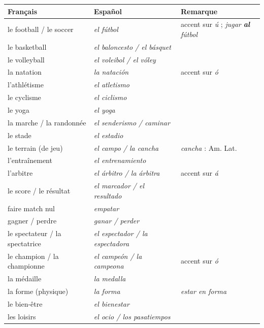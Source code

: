 \documentclass[11pt]{article}
\newcommand{\esp}[1]{\ifmmode\text{\textit{#1}}\else\begingroup\selectlanguage{spanish}\itshape #1\endgroup\fi}
\begin{document}
\begin{exemplebox}
\begin{center}
\begin{tabularx}{\linewidth}{|X|X|X|}
\hline
\rowcolor{popblueL} \textbf{Français} & \textbf{Español} & \textbf{Remarque} \\
\hline
le football / le soccer & \esp{el fútbol} & accent sur \emph{ú} ; \esp{jugar \textbf{al} fútbol} \\
le basketball & \esp{el baloncesto} / \esp{el básquet} &  \\
le volleyball & \esp{el voleibol} / \esp{el vóley} & \\
la natation & \esp{la natación} & accent sur \emph{ó} \\
l'athlétisme & \esp{el atletismo} & \\
le cyclisme & \esp{el ciclismo} & \\
le yoga & \esp{el yoga} & \\
la marche / la randonnée & \esp{el senderismo} / \esp{caminar} & \\
le stade & \esp{el estadio} & \\
le terrain (de jeu) & \esp{el campo} / \esp{la cancha} & \emph{cancha} : Am. Lat. \\
l'entraînement & \esp{el entrenamiento} & \\
l'arbitre & \esp{el árbitro / la árbitra} & accent sur \emph{á} \\
le score / le résultat & \esp{el marcador} / \esp{el resultado} & \\
faire match nul & \esp{empatar} & \\
gagner / perdre & \esp{ganar} / \esp{perder} & \\
le spectateur / la spectatrice & \esp{el espectador} / \esp{la espectadora} & \\
le champion / la championne & \esp{el campeón} / \esp{la campeona} & accent sur \emph{ó} \\
la médaille & \esp{la medalla} & \\
la forme (physique) & \esp{la forma} & \esp{estar en forma} \\
le bien-être & \esp{el bienestar} & \\
les loisirs & \esp{el ocio} / \esp{los pasatiempos} & \\
\hline
\end{tabularx}
\end{center}
\end{exemplebox}
\end{document}
